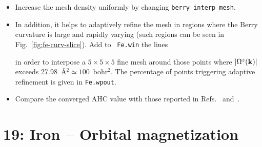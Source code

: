 \documentclass[a4paper,11pt,twoside]{article}
\begin{document}
  \begin{itemize}

  \item Increase the mesh density uniformly by
    changing {\tt berry\_interp\_mesh}.

  \item In addition, it helps to adaptively refine the mesh in regions
    where the Berry curvature is large and rapidly varying (such
    regions can be seen in Fig.~\ref{fig:fe-curv-slice}).  Add to {\tt
      Fe.win} the lines 
    
    in order to interpose a $5\times 5\times 5$ fine mesh around those
    points where $\vert\Omega^z({\bf k})\vert$ exceeds
    27.98~\AA$^2\simeq 100$~bohr$^2$. The percentage of points
    triggering adaptive refinement is given in {\tt Fe.wpout}.

  \item Compare the converged AHC value with those reported in
    Refs.~\cite{wang-prb06} and~\cite{yao-prl04}.

  \end{itemize}

%
%
  




\cleardoublepage

\section*{19: Iron -- Orbital magnetization}
\end{document}
